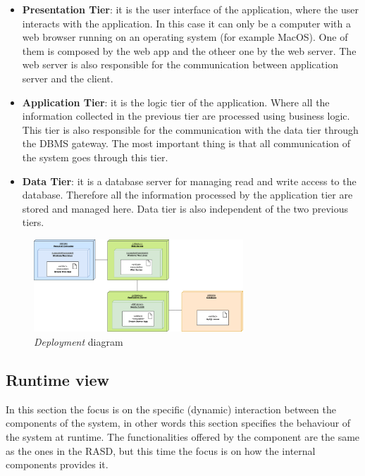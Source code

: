 \begin{itemize}
    \item \textbf{Presentation Tier}: it is the user interface of the application, where the user interacts with the application. 
    In this case it can only be a computer with a web browser running on an operating system (for example MacOS).
    One of them is composed by the web app and the otheer one by the web server. The web server is also responsible for the communication between application server and the client.

    \item \textbf{Application Tier}: it is the logic tier of the application. Where all the information 
    collected in the previous tier are processed using business logic. This tier is also 
    responsible for the communication with the data tier through the DBMS gateway.
    The most important thing is that all communication of the system goes through this tier.

    \item \textbf{Data Tier}: it is a database server for managing read and write access to the database. 
    Therefore all the information processed by the application tier are stored and managed here.
    Data tier is also independent of the two previous tiers. 
\end{itemize}

\begin{figure}[H]
    \begin{center}
    \includegraphics[width=0.7\textwidth]{images/Deployment diagram.png}
    \caption{\emph{Deployment} diagram}
    \label{fig:deployment}
    \end{center}
\end{figure}
\subsection{Runtime view}

In this section the focus is on the specific (dynamic) interaction between the components of the system, in other words this section specifies the behaviour of the system at runtime.
The functionalities offered by the component are the same as the ones in the RASD, but this time the focus is on how the internal components provides it.

